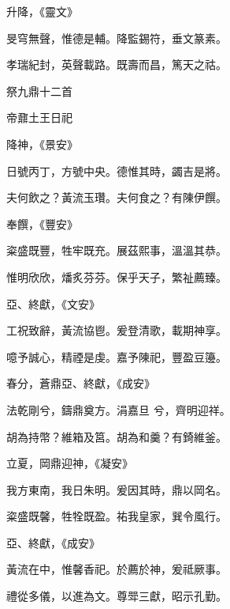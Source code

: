 \begin{pinyinscope}
 升降，《靈文》



 旻穹無聲，惟德是輔。降監錫符，垂文篆素。



 孝瑞紀封，英聲載路。既壽而昌，篤天之祜。



 祭九鼎十二首



 帝鼐土王日祀



 降神，《景安》



 日號丙丁，方號中央。德惟其時，蠲吉是將。



 夫何飲之？黃流玉瓚。夫何食之？有陳伊饌。



 奉饌，《豐安》



 粢盛既豐，牲牢既充。展茲熙事，溫溫其恭。



 惟明欣欣，燔炙芬芬。保乎天子，繁祉薦臻。



 亞、終獻，《文安》



 工祝致辭，黃流協鬯。爰登清歌，載期神享。



 噫予誠心，精禋是虔。嘉予陳祀，豐盈豆籩。



 春分，蒼鼎亞、終獻，《成安》



 法乾剛兮，鑄鼎奠方。涓嘉旦
 兮，齊明迎祥。



 胡為持幣？維箱及筥。胡為和羹？有錡維釜。



 立夏，岡鼎迎神，《凝安》



 我方東南，我日朱明。爰因其時，鼎以岡名。



 粢盛既馨，牲牷既盈。祐我皇家，巽令風行。



 亞、終獻，《成安》



 黃流在中，惟馨香祀。於薦於神，爰祗厥事。



 禮從多儀，以進為文。尊斝三獻，昭示孔勤。




\end{pinyinscope}
